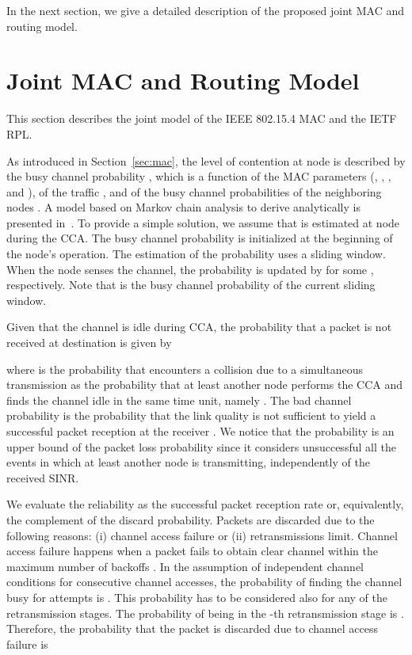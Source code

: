 \documentclass[review, 1p, 11pt]{elsarticle}
\numberwithin{equation}{section}
\begin{document}
In the next section, we give a detailed description of the proposed joint MAC and routing model.


\section{Joint MAC and Routing Model} \label{sec:interactions}
This section describes the joint model of the IEEE 802.15.4 MAC and the IETF RPL.

As introduced in Section~\ref{sec:mac}, the level of contention at node  is described by the busy channel probability , which is a function of the MAC parameters (, , , and ), of the traffic , and of the busy channel probabilities of the neighboring nodes .
A model based on Markov chain analysis to derive  analytically is presented in~\cite{PG_TVT}. To provide a simple solution, we assume that  is estimated at node  during the CCA. The busy channel probability is initialized at the beginning of the node's operation. The estimation of the probability uses a sliding window. When the node senses the channel, the probability is updated by  for some , respectively. Note that  is the busy channel probability of the current sliding window.

Given that the channel is idle during CCA, the probability  that a packet is not received at destination  is given by

where  is the probability that  encounters a collision due to a simultaneous transmission as the probability that at least another node performs the CCA and finds the channel idle in the same time unit, namely
.
The bad channel probability  is the probability that the link quality is not sufficient to yield a successful packet reception at the receiver .
We notice that the probability  is an upper bound of the packet loss probability since it considers unsuccessful all the events in which at least another node is transmitting, independently of the received SINR.

We evaluate the reliability as
the successful packet reception rate or, equivalently, the
complement of the discard probability.
Packets are
discarded due to the following reasons: (i) channel access failure or (ii) retransmissions limit. Channel access failure
happens when a packet fails to obtain clear channel within the maximum number of backoffs .
In the assumption of independent channel conditions for consecutive channel accesses, the probability
of finding the channel busy for  attempts is . This probability has to be considered also for any of the  
retransmission stages. The probability of being in the -th retransmission stage is .
Therefore, the probability that the packet is discarded due to channel access failure is
\end{document}
